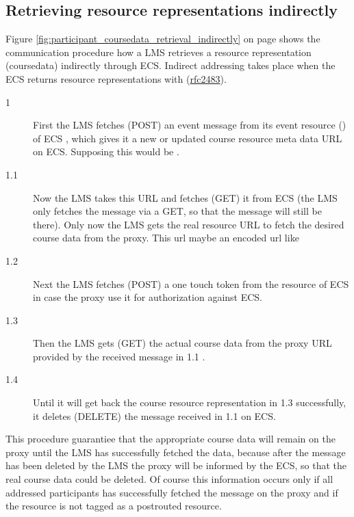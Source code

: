 \subsection{Retrieving resource representations indirectly}\label{heading:participant_coursedata_retrieval_indirectly}
Figure \ref{fig:participant_coursedata_retrieval_indirectly} on page
\pageref{fig:participant_coursedata_retrieval_indirectly} shows the
communication procedure how a LMS retrieves a resource representation
(coursedata) indirectly through ECS. Indirect addressing takes place when the
ECS returns resource representations with  
(\href{http://tools.ietf.org/html/rfc2483#section-5}{rfc2483}).
\begin{description}
  \item[1] First the LMS fetches (POST)  an event message from its event resource
  () of ECS , which gives it a new or updated course
  resource meta data URL on ECS. Supposing this would be .
  \item[1.1] Now the LMS takes this URL and fetches (GET) it from ECS (the LMS
  only fetches the message via a GET, so that the message will still be there).
  Only now the LMS gets the real resource URL to fetch the desired course data
  from the proxy. This url maybe an encoded url like 
  \item[1.2] Next the LMS fetches (POST) a one touch token from the 
  resource of ECS in case the proxy use it for authorization against ECS.
  \item[1.3] Then the LMS gets (GET) the actual course data from the proxy URL
  provided by the received message in 1.1 . 
  \item[1.4] Until it will get back the course resource representation in 1.3
  successfully, it deletes (DELETE) the message 
  received in 1.1 on ECS.
\end{description}
This procedure guarantiee that the appropriate course data will remain on the
proxy until the LMS has successfully fetched the data, because after the
message  has been deleted by the LMS the proxy
will be informed by the ECS, so that the real course data  could be deleted.
Of course this information occurs only if all addressed participants has
successfully fetched the message on the proxy and if the
 resource is not tagged as a postrouted resource. 
